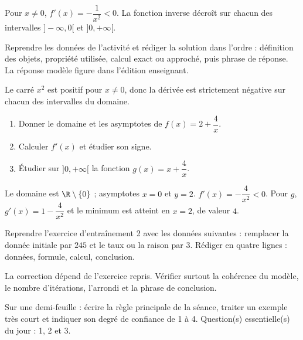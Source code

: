 \begin{summary}Pour $x\neq0$, $f'(x)=-\dfrac1{x^2}<0$. La fonction inverse décroît sur chacun des intervalles $]-\infty,0[$ et $]0,+\infty[$.\end{summary}

\begin{example}
Reprendre les données de l'activité et rédiger la solution dans l'ordre : définition des objets, propriété utilisée, calcul exact ou approché, puis phrase de réponse. La réponse modèle figure dans l'édition enseignant.
\end{example}
\begin{solution}Le carré $x^2$ est positif pour $x\neq0$, donc la dérivée est strictement négative sur chacun des intervalles du domaine.\end{solution}

\begin{exercise}[essentiel]
\begin{enumerate}\item Donner le domaine et les asymptotes de $f(x)=2+\dfrac{4}x$.\item Calculer $f'(x)$ et étudier son signe.\item Étudier sur $]0,+\infty[$ la fonction $g(x)=x+\dfrac{4}x$.\end{enumerate}
\end{exercise}
\begin{solution}Le domaine est $\R\setminus\{0\}$ ; asymptotes $x=0$ et $y=2$. $f'(x)=-\dfrac{4}{x^2}<0$. Pour $g$, $g'(x)=1-\dfrac{4}{x^2}$ et le minimum est atteint en $x=2$, de valeur $4$.\end{solution}


\begin{homework}Reprendre l'exercice d'entraînement 2 avec les données suivantes : remplacer la donnée initiale par $245$ et le taux ou la raison par $3$. Rédiger en quatre lignes : données, formule, calcul, conclusion.\end{homework}
\begin{solution}La correction dépend de l'exercice repris. Vérifier surtout la cohérence du modèle, le nombre d'itérations, l'arrondi et la phrase de conclusion.\end{solution}

\begin{exitticket}[3 minutes]Sur une demi-feuille : écrire la règle principale de la séance, traiter un exemple très court et indiquer son degré de confiance de 1 à 4. Question(s) essentielle(s) du jour : 1, 2 et 3.\end{exitticket}


